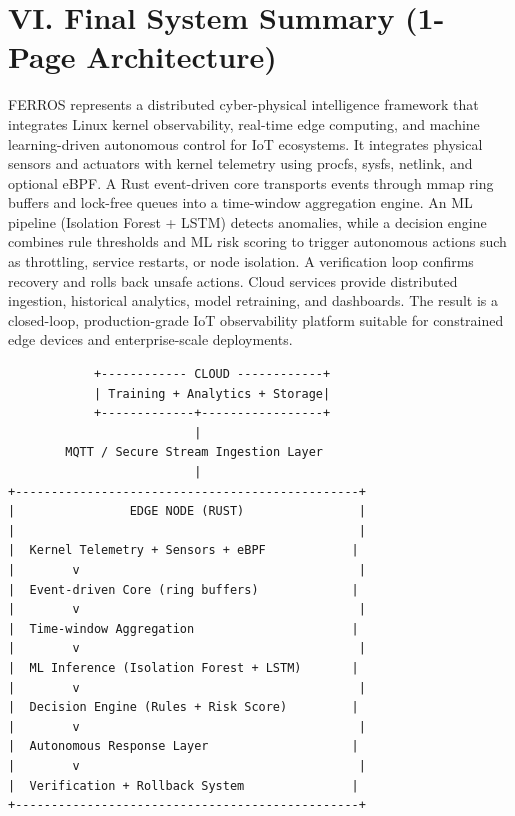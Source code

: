 \documentclass[11pt]{article}
\begin{document}
\section*{VI. Final System Summary (1-Page Architecture)}
FERROS represents a distributed cyber-physical intelligence framework that integrates Linux kernel observability, real-time edge computing, and machine learning-driven autonomous control for IoT ecosystems. It integrates physical sensors and actuators with kernel telemetry using procfs, sysfs, netlink, and optional eBPF. A Rust event-driven core transports events through mmap ring buffers and lock-free queues into a time-window aggregation engine. An ML pipeline (Isolation Forest + LSTM) detects anomalies, while a decision engine combines rule thresholds and ML risk scoring to trigger autonomous actions such as throttling, service restarts, or node isolation. A verification loop confirms recovery and rolls back unsafe actions. Cloud services provide distributed ingestion, historical analytics, model retraining, and dashboards. The result is a closed-loop, production-grade IoT observability platform suitable for constrained edge devices and enterprise-scale deployments.

\begin{lstlisting}
            +------------ CLOUD ------------+
            | Training + Analytics + Storage|
            +-------------+-----------------+
                          |
        MQTT / Secure Stream Ingestion Layer
                          |
+------------------------------------------------+
|                EDGE NODE (RUST)                |
|                                                |
|  Kernel Telemetry + Sensors + eBPF            |
|        v                                       |
|  Event-driven Core (ring buffers)             |
|        v                                       |
|  Time-window Aggregation                      |
|        v                                       |
|  ML Inference (Isolation Forest + LSTM)       |
|        v                                       |
|  Decision Engine (Rules + Risk Score)         |
|        v                                       |
|  Autonomous Response Layer                    |
|        v                                       |
|  Verification + Rollback System               |
+------------------------------------------------+
\end{lstlisting}
\end{document}
